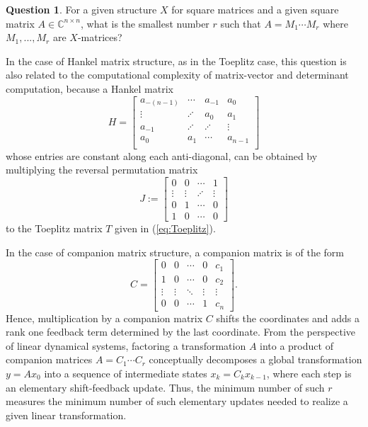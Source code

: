 \documentclass[reqno]{amsart}
\theoremstyle{definition}
\newtheorem{question}[theorem]{Question}
\numberwithin{equation}{section}
\begin{document}
\begin{question}
    For a given structure $X$ for square matrices and a given square matrix $A \in \mathbb{C}^{n \times n}$, what is the smallest number $r$ such that $A=M_1\cdots M_r$ where $M_1,...,M_r$ are $X$-matrices?
\end{question}

In the case of Hankel matrix structure, as in the Toeplitz case, this question is also related to the computational complexity of matrix-vector and determinant computation, because a Hankel matrix
\begin{equation*}
    H = 
    \begin{bmatrix}
        a_{-(n-1)} & \cdots & a_{-1} & a_{0}\\
        \vdots & \iddots & a_{0} & a_{1}\\
        a_{-1} & \iddots & \iddots & \vdots \\
        a_{0} & a_{1} & \cdots & a_{n-1}\\
    \end{bmatrix}
\end{equation*}
whose entries are constant along each anti-diagonal, can be obtained by multiplying the reversal permutation matrix
\begin{equation}\label{eq:reversal permutation matrix}
    J:=\begin{bmatrix}
        0 & 0 & \cdots & 1\\
        \vdots & \vdots & \iddots & \vdots\\
        0 & 1 & \cdots & 0\\
        1 & 0 & \cdots & 0
    \end{bmatrix}
\end{equation} 
to the Toeplitz matrix $T$ given in (\ref{eq:Toeplitz}).

In the case of companion matrix structure, a companion matrix is of the form
\begin{equation*}
    C = 
    \begin{bmatrix}
        0 & 0 & \cdots & 0 & c_1\\
        1 & 0 & \cdots & 0 & c_2\\
        \vdots & \vdots & \ddots & \vdots & \vdots \\
        0 & 0 & \cdots & 1 & c_n
    \end{bmatrix}.
\end{equation*}
Hence, multiplication by a companion matrix $C$ shifts the coordinates and adds a rank one feedback term determined by the last coordinate. From the perspective of linear dynamical systems, factoring a transformation $A$ into a product of companion matrices $A = C_1 \cdots C_r$ conceptually decomposes a global transformation $y = Ax_0$ into a sequence of intermediate states $x_k = C_k x_{k-1}$, where each step is an elementary shift-feedback update. Thus, the minimum number of such $r$ measures the minimum number of such elementary updates needed to realize a given linear transformation.
\end{document}
